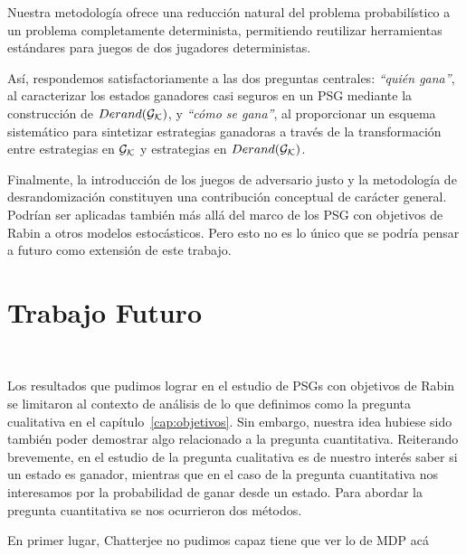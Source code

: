 Nuestra metodología ofrece una reducción natural del problema probabilístico a
un problema completamente determinista, permitiendo reutilizar herramientas
estándares para juegos de dos jugadores deterministas.

Así, respondemos satisfactoriamente a las dos preguntas centrales:
\textit{“quién gana”}, al caracterizar los estados ganadores casi seguros en un
PSG mediante la construcción de $Derand(\mathcal{G}_{\mathcal{K}})$, y \textit{“cómo se gana”}, al
proporcionar un esquema sistemático para sintetizar estrategias ganadoras a
través de la transformación entre estrategias en $\mathcal{G}_{\mathcal{K}}$ y estrategias en $Derand(\mathcal{G}_{\mathcal{K}})$.

Finalmente, la introducción de los juegos de adversario justo y la metodología
de desrandomización constituyen una contribución conceptual de carácter
general. Podrían ser aplicadas también más allá del marco de los PSG con
objetivos de Rabin a otros modelos estocásticos. Pero esto no es lo único que
se podría pensar a futuro como extensión de este trabajo.


\section{Trabajo Futuro}
~\label{cap:conclusions:sec:future}

Los resultados que pudimos lograr en el estudio de PSGs con objetivos de Rabin se limitaron al contexto de análisis de lo que definimos como la pregunta cualitativa en el capítulo~\ref{cap:objetivos}. Sin embargo, nuestra idea hubiese sido también poder demostrar algo relacionado a la pregunta cuantitativa. Reiterando brevemente, en el estudio de la pregunta cualitativa es de nuestro interés saber si un estado es ganador, mientras que en el caso de la pregunta cuantitativa nos interesamos por la probabilidad de ganar desde un estado. Para abordar la pregunta cuantitativa se nos ocurrieron dos métodos.

En primer lugar, Chatterjee no pudimos capaz tiene que ver lo de MDP acá

